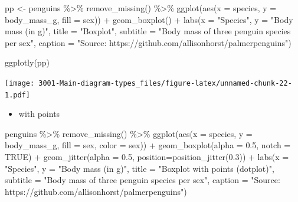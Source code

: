 \documentclass[
]{book}
\newenvironment{Shaded}{\begin{snugshade}}{\end{snugshade}}
\newcommand{\AttributeTok}[1]{\textcolor[rgb]{0.77,0.63,0.00}{#1}}
\newcommand{\ConstantTok}[1]{\textcolor[rgb]{0.00,0.00,0.00}{#1}}
\newcommand{\FloatTok}[1]{\textcolor[rgb]{0.00,0.00,0.81}{#1}}
\newcommand{\FunctionTok}[1]{\textcolor[rgb]{0.00,0.00,0.00}{#1}}
\newcommand{\NormalTok}[1]{#1}
\newcommand{\OtherTok}[1]{\textcolor[rgb]{0.56,0.35,0.01}{#1}}
\newcommand{\SpecialCharTok}[1]{\textcolor[rgb]{0.00,0.00,0.00}{#1}}
\newcommand{\StringTok}[1]{\textcolor[rgb]{0.31,0.60,0.02}{#1}}
\providecommand{\tightlist}{%
  \setlength{\itemsep}{0pt}\setlength{\parskip}{0pt}}
\begin{document}
\begin{Shaded}
\begin{Highlighting}[]
\NormalTok{pp }\OtherTok{\textless{}{-}}\NormalTok{ penguins }\SpecialCharTok{\%\textgreater{}\%}
    \FunctionTok{remove\_missing}\NormalTok{() }\SpecialCharTok{\%\textgreater{}\%}
    \FunctionTok{ggplot}\NormalTok{(}\FunctionTok{aes}\NormalTok{(}\AttributeTok{x =}\NormalTok{ species, }\AttributeTok{y =}\NormalTok{ body\_mass\_g,}
               \AttributeTok{fill =}\NormalTok{ sex)) }\SpecialCharTok{+}
    \FunctionTok{geom\_boxplot}\NormalTok{() }\SpecialCharTok{+}
      \FunctionTok{labs}\NormalTok{(}\AttributeTok{x =} \StringTok{"Species"}\NormalTok{, }
           \AttributeTok{y =} \StringTok{"Body mass (in g)"}\NormalTok{,}
          \AttributeTok{title =} \StringTok{"Boxplot"}\NormalTok{, }
          \AttributeTok{subtitle =} \StringTok{"Body mass of three penguin species per sex"}\NormalTok{,}
          \AttributeTok{caption =} \StringTok{"Source: https://github.com/allisonhorst/palmerpenguins"}\NormalTok{)}

\FunctionTok{ggplotly}\NormalTok{(pp)}
\end{Highlighting}
\end{Shaded}

\texttt{[image: 3001-Main-diagram-types\_files/figure-latex/unnamed-chunk-22-1.pdf]}

\begin{itemize}
\tightlist
\item
  with points
\end{itemize}

\begin{Shaded}
\begin{Highlighting}[]
\NormalTok{penguins }\SpecialCharTok{\%\textgreater{}\%}
    \FunctionTok{remove\_missing}\NormalTok{() }\SpecialCharTok{\%\textgreater{}\%}
    \FunctionTok{ggplot}\NormalTok{(}\FunctionTok{aes}\NormalTok{(}\AttributeTok{x =}\NormalTok{ species, }\AttributeTok{y =}\NormalTok{ body\_mass\_g,}
               \AttributeTok{fill =}\NormalTok{ sex, }\AttributeTok{color =}\NormalTok{ sex)) }\SpecialCharTok{+}
    \FunctionTok{geom\_boxplot}\NormalTok{(}\AttributeTok{alpha =} \FloatTok{0.5}\NormalTok{, }\AttributeTok{notch =} \ConstantTok{TRUE}\NormalTok{) }\SpecialCharTok{+}
    \FunctionTok{geom\_jitter}\NormalTok{(}\AttributeTok{alpha =} \FloatTok{0.5}\NormalTok{, }\AttributeTok{position=}\FunctionTok{position\_jitter}\NormalTok{(}\FloatTok{0.3}\NormalTok{)) }\SpecialCharTok{+}
      \FunctionTok{labs}\NormalTok{(}\AttributeTok{x =} \StringTok{"Species"}\NormalTok{, }
           \AttributeTok{y =} \StringTok{"Body mass (in g)"}\NormalTok{,}
          \AttributeTok{title =} \StringTok{"Boxplot with points (dotplot)"}\NormalTok{, }
          \AttributeTok{subtitle =} \StringTok{"Body mass of three penguin species per sex"}\NormalTok{,}
          \AttributeTok{caption =} \StringTok{"Source: https://github.com/allisonhorst/palmerpenguins"}\NormalTok{)}
\end{Highlighting}
\end{Shaded}
\end{document}
